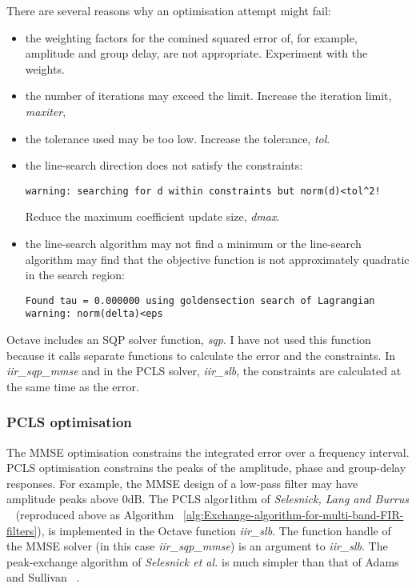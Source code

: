\documentclass[a4paper,twoside,10pt,english]{report}
\begin{document}
There are several reasons why an optimisation attempt might fail:
\begin{itemize}
\item the weighting factors for the comined squared error of, for example,
amplitude and group delay, are not appropriate. Experiment with the weights.
\item the number of iterations may exceed the limit. Increase the iteration
  limit, \emph{maxiter},
\item the tolerance used may be too low. Increase the tolerance, \emph{tol}.
\item the line-search direction does not satisfy the constraints:
\begin{verbatim}
warning: searching for d within constraints but norm(d)<tol^2!
\end{verbatim}
Reduce the maximum coefficient update size, \emph{dmax}.
\item the line-search algorithm may not find a minimum or
  the line-search algorithm may find that the objective function is not
  approximately quadratic in the search region:
\begin{verbatim}
Found tau = 0.000000 using goldensection search of Lagrangian
warning: norm(delta)<eps
\end{verbatim}
\end{itemize}

Octave includes an SQP solver function, \emph{sqp}. I have not used this 
function because it calls separate functions to calculate the error and the
constraints. In  \emph{iir\_sqp\_mmse} and in the PCLS
solver, \emph{iir\_slb}, the constraints are calculated at the same
time as the error.

\subsubsection{PCLS optimisation}
The MMSE optimisation constrains the integrated error over a frequency interval.
PCLS optimisation constrains the peaks of the amplitude, phase and group-delay
responses. For example, the MMSE design of a low-pass filter may have amplitude
peaks above $0\text{dB}$. The PCLS algor1ithm of
\emph{Selesnick, Lang and Burrus}
~\cite[Fig.4,p.499]{SelesnickLangBurrus_ConstrainedLeastSquareMultiBandFIRFilters}
(reproduced above as Algorithm
~\ref{alg:Exchange-algorithm-for-multi-band-FIR-filters}), is implemented in the 
Octave function \emph{iir\_slb}.
The function handle of the MMSE solver (in this case \emph{iir\_sqp\_mmse})
is an argument to \emph{iir\_slb}.
The peak-exchange algorithm of \emph{Selesnick et al.} is much
simpler than that of Adams and Sullivan 
~\cite[Section IV]{AdamsSullivan_PeakConstrainedLeastSquaresOptimization}.
\end{document}
